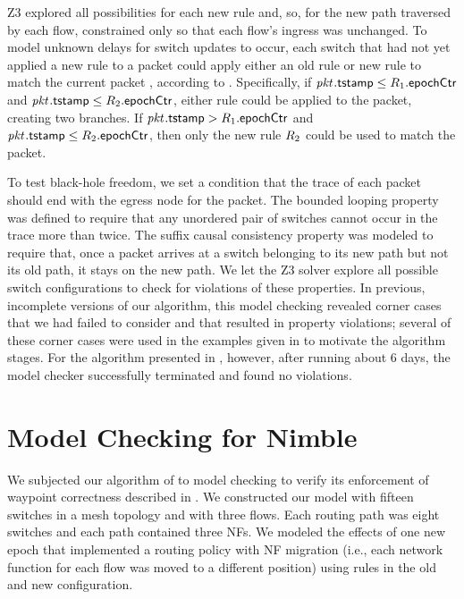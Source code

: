 Z3 explored all possibilities for each new rule and, so, for the
  new path traversed by each flow, constrained only so that each flow's
  ingress was unchanged.  To model unknown delays for switch updates
to occur, each switch that had not yet applied a new rule to a packet
could apply either an old rule  or new rule  to
match the current packet \pktID{}, according to
\pktID{}{\tagTmpField}.  Specifically, if $\pktID{}{\tagTmpField} \le
\ruleID{1}{\epochField}$ and $\pktID{}{\tagTmpField} \le
\ruleID{2}{\epochField}$, either rule could be applied to the packet,
creating two branches. If $\pktID{}{\tagTmpField} >
\ruleID{1}{\epochField}$ and $\pktID{}{\tagTmpField} \le
\ruleID{2}{\epochField}$, then only the new rule $\ruleID{2}$ could be
used to match the packet.

To test black-hole freedom, we set a condition that the trace of
each packet should end with the egress node for the packet. The
bounded looping property was defined to require that any unordered
pair of switches cannot occur in the trace more than twice.
The suffix causal consistency property was modeled to require
  that, once a packet arrives at a switch belonging to its new path
  but not its old path, it stays on the new path.
We let the Z3 solver explore all possible switch configurations to
check for violations of these properties.  In previous, incomplete
versions of our algorithm, this model checking revealed corner cases
that we had failed to consider and that resulted in property
violations; several of these corner cases were used in the examples
given in  to motivate the algorithm
stages.  For the algorithm presented in ,
however, after running about $6$ days, the model checker successfully 
terminated and found no violations.



\section{Model Checking for Nimble}
\label{sec:schedule:model_checking}

We subjected our algorithm of  to model checking to verify its enforcement of
waypoint correctness described in .
We constructed our model with fifteen switches in a mesh topology and
with three flows.  Each routing path was eight switches and each path
contained three NFs.  We modeled the effects of one new epoch that
implemented a routing policy with NF migration (i.e., each network
function for each flow was moved to a different position) using rules
in the old and new configuration.

